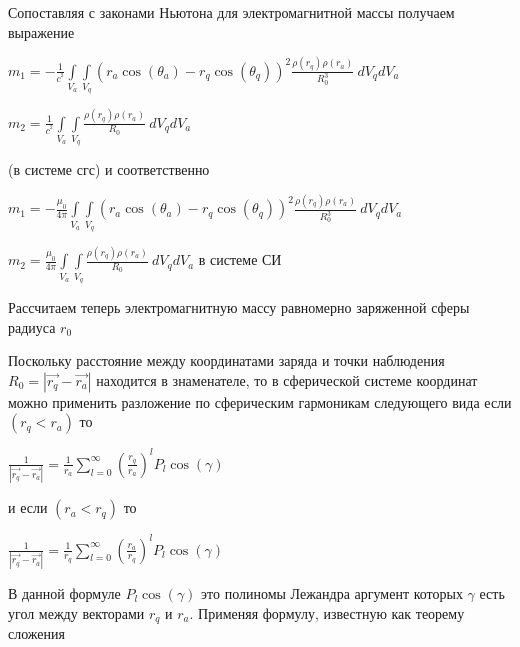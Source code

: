 \documentclass{article}
\begin{document}
Сопоставляя с законами Ньютона для электромагнитной массы получаем выражение

$m_1= - \frac{1}{{{c}^{^{2}}}}\int\limits_{{{V}_{a}}}{\int\limits_{{{V}_{q}}}{\left( {{r}_{a}}\cos \left( {{\theta }_{a}} \right)-{{r}_{q}}\cos \left( {{\theta }_{q}} \right) \right)^2\frac{\rho \left( {{r}_{q}} \right)\rho \left( {{r}_{a}} \right)}{R_{0}^3}}}\ d{{V}_{q}}d{{V}_{a}}$


$m_2=\frac{1}{{{c}^{^{2}}}}\int\limits_{{{V}_{a}}}{\int\limits_{{{V}_{q}}}{\frac{\rho \left( {{r}_{q}} \right)\rho \left( {{r}_{a}} \right)}{R_{0}}}}\ d{{V}_{q}}d{{V}_{a}}$

 (в системе сгс)
 и соответственно

$m_1= - \frac{{{\mu }_{0}}}{4\pi } \int\limits_{{{V}_{a}}}{\int\limits_{{{V}_{q}}}{\left( {{r}_{a}}\cos \left( {{\theta }_{a}} \right)-{{r}_{q}}\cos \left( {{\theta }_{q}} \right) \right)^2\frac{\rho \left( {{r}_{q}} \right)\rho \left( {{r}_{a}} \right)}{R_{0}^3}}}\ d{{V}_{q}}d{{V}_{a}}$


 $m_2=\frac{{{\mu }_{0}}}{4\pi }\int\limits_{{{V}_{a}}}{\int\limits_{{{V}_{q}}}{\frac{\rho \left( {{r}_{q}} \right)\rho \left( {{r}_{a}} \right)}{R_{0}}}}\ d{{V}_{q}}d{{V}_{a}}$ в системе СИ

Рассчитаем теперь электромагнитную массу равномерно заряженной сферы радиуса ${{r}_{0}}$

Поскольку расстояние между координатами заряда и точки наблюдения ${{R}_{0}}=\left|\overrightarrow{r_{q}} - \overrightarrow{r_{a}}\right|$ находится в знаменателе, то в сферической системе координат можно применить разложение по сферическим гармоникам следующего вида  \cite{flugge} если $\left( {{r}_{q}}<{{r}_{a}} \right)$ то

$\frac{1}{\left| \overrightarrow{{{r}_{q}}}-\overrightarrow{{{r}_{a}}} \right|}=\frac{1}{{{r}_{a}}}\sum\limits_{l=0}^{\infty }{{{\left( \frac{{{r}_{q}}}{{{r}_{a}}} \right)}^{l}}{{P}_{l}} \cos \left( \gamma  \right)}$

и если $\left( {{r}_{a}}<{{r}_{q}} \right)$ то

$\frac{1}{\left| \overrightarrow{{{r}_{q}}}-\overrightarrow{{{r}_{a}}} \right|}=\frac{1}{{{r}_{q}}}\sum\limits_{l=0}^{\infty }{{{\left( \frac{{{r}_{a}}}{{{r}_{q}}} \right)}^{l}}{{P}_{l}} \cos \left( \gamma  \right)}$

В данной формуле ${{P}_{l}} \cos \left( \gamma  \right)$ это полиномы Лежандра аргумент которых $\gamma$ есть угол между векторами ${{r}_{q}}$  и ${{r}_{a}}$. Применяя формулу, известную как теорему сложения
\end{document}
